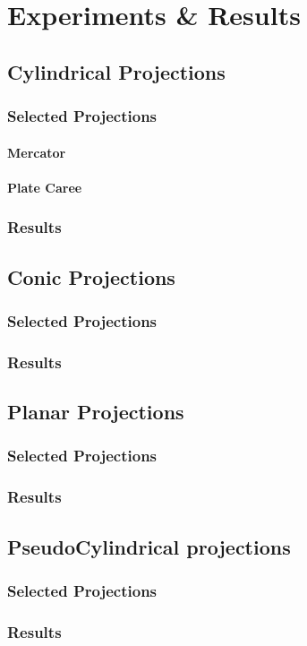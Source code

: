 
\clearpage
\cleardoublepage

\chapter{Experiments \& Results}

\section{Cylindrical Projections}
\subsection*{Selected Projections}
\subsubsection*{Mercator}
\subsubsection*{Plate Caree}
\subsubsection*{}
\subsection{Results}

\section{Conic Projections}
\subsection*{Selected Projections}
\subsection{Results}
\section{Planar Projections}
\subsection*{Selected Projections}
\subsection{Results}
\section{PseudoCylindrical projections}
\subsection*{Selected Projections}
\subsection{Results}
